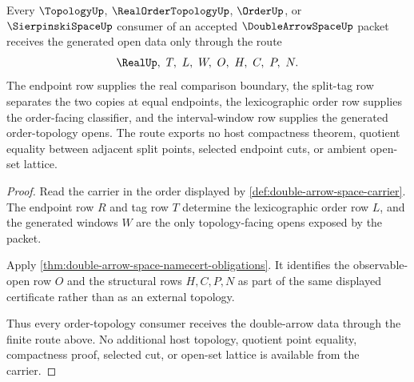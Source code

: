 \begin{theorem}
\label{thm:double-arrow-space-order-topology-route}
Every $\TopologyUp$, $\RealOrderTopologyUp$, $\OrderUp$, or $\SierpinskiSpaceUp$ consumer of an accepted $\DoubleArrowSpaceUp$ packet receives the generated open data only through the route
$$
\RealUp,\ T,\ L,\ W,\ O,\ H,\ C,\ P,\ N .
$$
The endpoint row supplies the real comparison boundary, the split-tag row separates the two copies at equal endpoints, the lexicographic order row supplies the order-facing classifier, and the interval-window row supplies the generated order-topology opens. The route exports no host compactness theorem, quotient equality between adjacent split points, selected endpoint cuts, or ambient open-set lattice.
\end{theorem}
\begin{proof}
Read the carrier in the order displayed by \autoref{def:double-arrow-space-carrier}. The endpoint row $R$ and tag row $T$ determine the lexicographic order row $L$, and the generated windows $W$ are the only topology-facing opens exposed by the packet.

Apply \autoref{thm:double-arrow-space-namecert-obligations}. It identifies the observable-open row $O$ and the structural rows $H,C,P,N$ as part of the same displayed certificate rather than as an external topology.

Thus every order-topology consumer receives the double-arrow data through the finite route above. No additional host topology, quotient point equality, compactness proof, selected cut, or open-set lattice is available from the carrier.
\end{proof}




